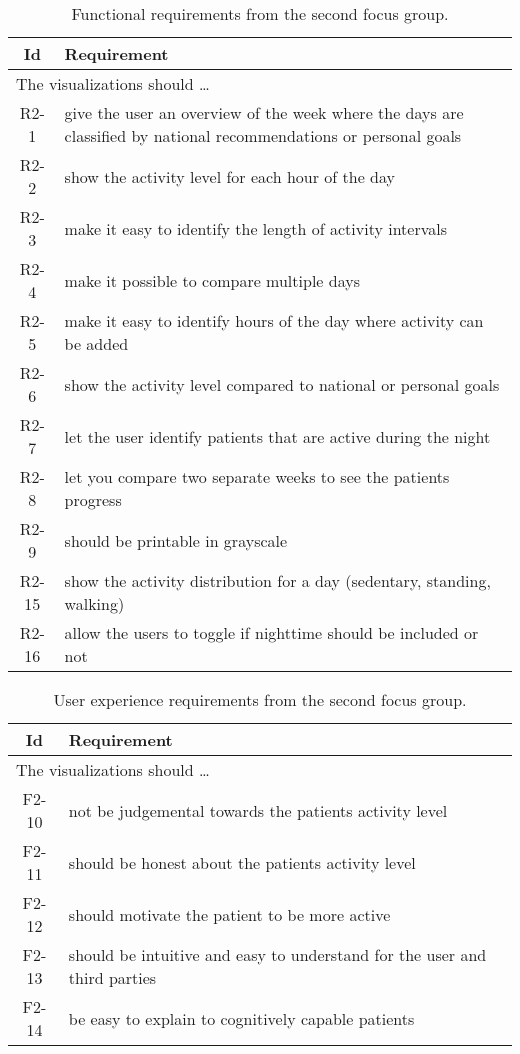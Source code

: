 \begin{table}[h!]
  \begin{center}
  \begin{tabular}{|c|p{12cm}|}
    \hline
      \textbf{Id} & \textbf{Requirement} \\ \hline
    \multicolumn{2}{|l|}{The visualizations should \ldots} \\ \hline
      R2-1 & give the user an overview of the week where the days are classified by national recommendations or personal goals \\ \hline
      R2-2 & show the activity level for each hour of the day \\ \hline
      R2-3 & make it easy to identify the length of activity intervals \\ \hline
      R2-4 & make it possible to compare multiple days \\ \hline
      R2-5 & make it easy to identify hours of the day where activity can be added \\ \hline
      R2-6 & show the activity level compared to national or personal goals \\ \hline
      R2-7 & let the user identify patients that are active during the night \\ \hline
      R2-8 & let you compare two separate weeks to see the patients progress \\ \hline
      R2-9 & should be printable in grayscale \\ \hline
      R2-15 & show the activity distribution for a day (sedentary, standing, walking) \\ \hline
      R2-16 & allow the users to toggle if nighttime should be included or not \\ \hline
  \end{tabular}
  \end{center}
  \caption{Functional requirements from the second focus group.}
\end{table}

\begin{table}[h!]
  \begin{center}
  \begin{tabular}{|c|p{12cm}|}
    \hline
      \textbf{Id} & \textbf{Requirement} \\ \hline
    \multicolumn{2}{|l|}{The visualizations should \ldots} \\ \hline
      F2-10 & not be judgemental towards the patients activity level \\ \hline
      F2-11 & should be honest about the patients activity level \\ \hline
      F2-12 & should motivate the patient to be more active \\ \hline
      F2-13 & should be intuitive and easy to understand for the user and third parties \\ \hline
      F2-14 & be easy to explain to cognitively capable patients \\ \hline
  \end{tabular}
  \end{center}
  \caption{User experience requirements from the second focus group.}
\end{table}


